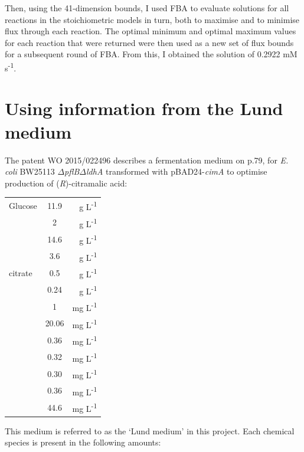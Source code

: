 \documentclass[parskip=full, numbers=noenddot]{scrreprt}
\begin{document}
Then, using the 41-dimension bounds, I used FBA to evaluate solutions for all reactions in the stoichiometric models in turn, both to maximise and to minimise flux through each reaction. The optimal minimum and optimal maximum values for each reaction that were returned were then used as a new set of flux bounds for a subsequent round of FBA. From this, I obtained the solution of 0.2922 mM s\textsuperscript{-1}.

\section{Using information from the Lund medium}
\label{sec:lund}

The patent WO 2015/022496 \citep{eastham_process_2015} describes a fermentation medium on p.79, for \emph{E. coli} BW25113 $\Delta$\emph{pflB}$\Delta$\emph{ldhA} transformed with pBAD24-\emph{cimA} to optimise production of (\emph{R})-citramalic acid:

\begin{tabular}{lSr}
  Glucose & 11.9 & g L\textsuperscript{-1}\\
   & 2 & g L\textsuperscript{-1}\\
   & 14.6 & g L\textsuperscript{-1}\\
   & 3.6 & g L\textsuperscript{-1}\\
   citrate & 0.5 & g L\textsuperscript{-1}\\
   & 0.24 & g L\textsuperscript{-1}\\
   & 1 & mg L\textsuperscript{-1}\\
   & 20.06 & mg L\textsuperscript{-1}\\
   & 0.36 & mg L\textsuperscript{-1}\\
   & 0.32 & mg L\textsuperscript{-1}\\
   & 0.30 & mg L\textsuperscript{-1}\\
   & 0.36 & mg L\textsuperscript{-1}\\
   & 44.6 & mg L\textsuperscript{-1}
\end{tabular}

This medium is referred to as the `Lund medium' in this project. Each chemical species is present in the following amounts:
\end{document}
